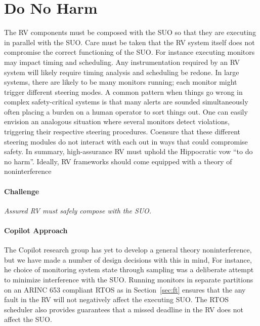 \section{Do No Harm} \label{sec:noninter} The RV components must be
composed with the SUO so that they are executing in parallel with the
SUO.  Care must be taken that the RV system itself  does not compromise the correct functioning of the
SUO.    For instance executing monitors may  impact timing and
scheduling. Any instrumentation required by an RV system will likely
require timing analysis and scheduling be redone. In large systems,
there are likely to be many monitors running; each monitor might
trigger different steering modes. A common pattern when things go
wrong in complex safety-critical systems is that many alerts are
sounded simultaneously often placing a burden on a human operator to
sort things out.  One can easily envision an analogous situation where
several monitors detect violations, triggering their respective
steering procedures. Coensure that these
different steering modules do not interact with each out in ways that
could compromise safety. In summary, high-assurance  RV must uphold the Hippocratic vow ``to do no
  harm''.   Ideally, RV frameworks should come equipped with a
  theory of noninterference

\paragraph{Challenge} \emph{Assured RV must safely compose with the
  SUO.}

\paragraph{Copilot Approach}  
The Copilot research group has yet to develop a general theory
noninterference, but we have made a number of design decisions with
this in mind, For instance, he choice of monitoring system state
through sampling was a deliberate attempt to minimize interference
with the SUO. Running monitors in separate partitions on an ARINC 653
compliant RTOS as in Section~\ref{sec:ft} ensures that the any fault
in the RV will not negatively affect the executing SUO. The RTOS
scheduler also provides guarantees that a missed deadline in the RV
does not affect the SUO. 

 

